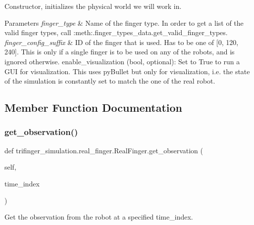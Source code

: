 Constructor, initializes the physical world we will work in. 


\begin{DoxyParams}{Parameters}
{\em finger\+\_\+type} & Name of the finger type. In order to get a list of the valid finger types, call \+:meth\+:{\ttfamily .finger\+\_\+types\+\_\+data.\+get\+\_\+valid\+\_\+finger\+\_\+types}. \\
\hline
{\em finger\+\_\+config\+\_\+suffix} & ID of the finger that is used. Has to be one of \mbox{[}0, 120, 240\mbox{]}. This is only if a single finger is to be used on any of the robots, and is ignored otherwise. enable\+\_\+visualization (bool, optional)\+: Set to \textquotesingle{}True\textquotesingle{} to run a G\+UI for visualization. This uses py\+Bullet but only for visualization, i.\+e. the state of the simulation is constantly set to match the one of the real robot. \\
\hline
\end{DoxyParams}


\subsection{Member Function Documentation}
\mbox{\label{classtrifinger__simulation_1_1real__finger_1_1RealFinger_a5e10f8a9627376f072ad2ea64ecdd361}} 
\subsubsection{\texorpdfstring{get\+\_\+observation()}{get\_observation()}}
{\footnotesize\ttfamily def trifinger\+\_\+simulation.\+real\+\_\+finger.\+Real\+Finger.\+get\+\_\+observation (\begin{DoxyParamCaption}\item[{}]{self,  }\item[{}]{time\+\_\+index }\end{DoxyParamCaption})}



Get the observation from the robot at a specified time\+\_\+index. 


